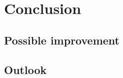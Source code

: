 \chapter{Conclusion}
\label{sec:Conclusion}

\section{Possible improvement}
\label{sec:improvement}

\section{Outlook}
\label{sec:outlook}
